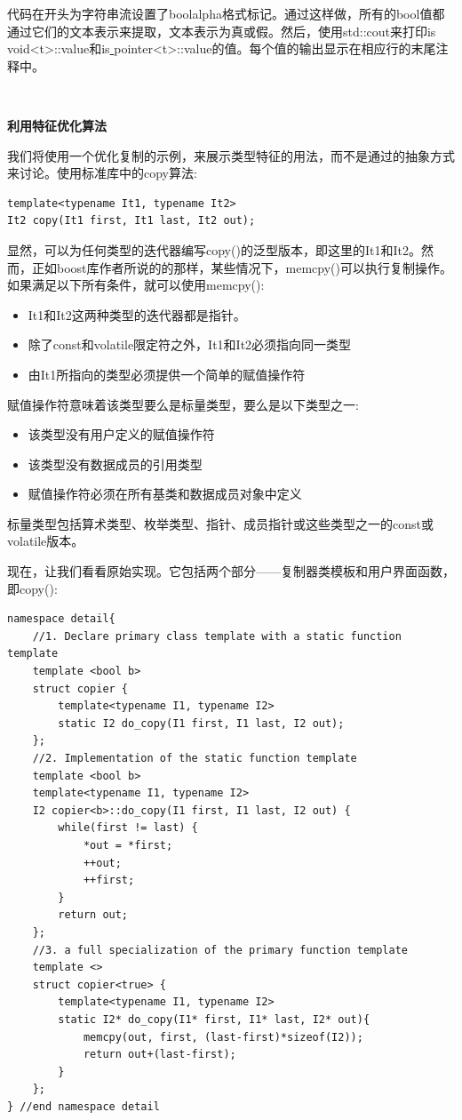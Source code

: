 代码在开头为字符串流设置了boolalpha格式标记。通过这样做，所有的bool值都通过它们的文本表示来提取，文本表示为真或假。然后，使用std::cout来打印is\underline{ }void<t>::value和is\underline{ }pointer<t>::value的值。每个值的输出显示在相应行的末尾注释中。 \par

\noindent\textbf{}\ \par
\textbf{利用特征优化算法} \ \par
我们将使用一个优化复制的示例，来展示类型特征的用法，而不是通过的抽象方式来讨论。使用标准库中的copy算法: \par

\begin{lstlisting}[caption={}]
template<typename It1, typename It2>
It2 copy(It1 first, It1 last, It2 out);
\end{lstlisting}

显然，可以为任何类型的迭代器编写copy()的泛型版本，即这里的It1和It2。然而，正如boost库作者所说的的那样，某些情况下，memcpy()可以执行复制操作。如果满足以下所有条件，就可以使用memcpy():\par

\begin{itemize}
	\item It1和It2这两种类型的迭代器都是指针。
	\item 除了const和volatile限定符之外，It1和It2必须指向同一类型
	\item 由It1所指向的类型必须提供一个简单的赋值操作符
\end{itemize}

赋值操作符意味着该类型要么是标量类型，要么是以下类型之一: \par

\begin{itemize}
	\item 该类型没有用户定义的赋值操作符
	\item 该类型没有数据成员的引用类型
	\item 赋值操作符必须在所有基类和数据成员对象中定义
\end{itemize}

标量类型包括算术类型、枚举类型、指针、成员指针或这些类型之一的const或volatile版本。 \par
现在，让我们看看原始实现。它包括两个部分——复制器类模板和用户界面函数，即copy(): \par

\begin{lstlisting}[caption={}]
namespace detail{
	//1. Declare primary class template with a static function template
	template <bool b>
	struct copier {
		template<typename I1, typename I2>
		static I2 do_copy(I1 first, I1 last, I2 out);
	};
	//2. Implementation of the static function template
	template <bool b>
	template<typename I1, typename I2>
	I2 copier<b>::do_copy(I1 first, I1 last, I2 out) {
		while(first != last) {
			*out = *first;
			++out;
			++first;
		}
		return out;
	};
	//3. a full specialization of the primary function template
	template <>
	struct copier<true> {
		template<typename I1, typename I2>
		static I2* do_copy(I1* first, I1* last, I2* out){
			memcpy(out, first, (last-first)*sizeof(I2));
			return out+(last-first);
		}
	};
} //end namespace detail
\end{lstlisting}

